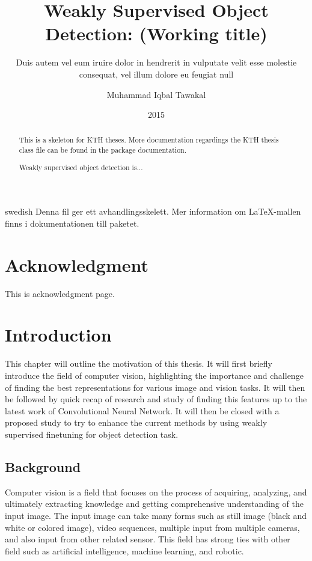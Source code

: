 \documentclass[a4paper,11pt]{kth-mag}
\title{Weakly Supervised Object Detection: (Working title)}
\subtitle{Duis autem vel eum iruire dolor in hendrerit in
          vulputate velit esse molestie consequat, vel illum
          dolore eu feugiat null}
\author{Muhammad Iqbal Tawakal}
\date{2015}
\begin{document}
\frontmatter
\pagestyle{empty}
\removepagenumbers
\maketitle
{}

\begin{abstract}
  This is a skeleton for KTH theses. More documentation
  regardings the KTH thesis class file can be found in
  the package documentation.
  
  Weakly supervised object detection is...
\end{abstract}

\clearpage
\begin{foreignabstract}{swedish}
  Denna fil ger ett avhandlingsskelett.
  Mer information om \LaTeX-mallen finns i
  dokumentationen till paketet.

\end{foreignabstract}
\clearpage

\chapter{Acknowledgment}
This is acknowledgment page.
\clearpage

\tableofcontents*
\mainmatter
\pagestyle{newchap}


\chapter{Introduction}
\label{chap:intro}
This chapter will outline the motivation of this thesis. It will first briefly introduce the field of computer vision, highlighting the importance and challenge of finding the best representations for various image and vision tasks. It will then be followed by quick recap of research and study of finding this features up to the latest work of Convolutional Neural Network. It will then be closed with a proposed study to try to enhance the current methods by using weakly supervised finetuning for object detection task.

\section{Background}
Computer vision is a field that focuses on the process of acquiring, analyzing, and ultimately extracting knowledge and getting comprehensive understanding of the input image. The input image can take many forms such as still image (black and white or colored image), video sequences, multiple input from multiple cameras, and also input from other related sensor. This field has strong ties with other field such as artificial intelligence, machine learning, and robotic.
\end{document}
